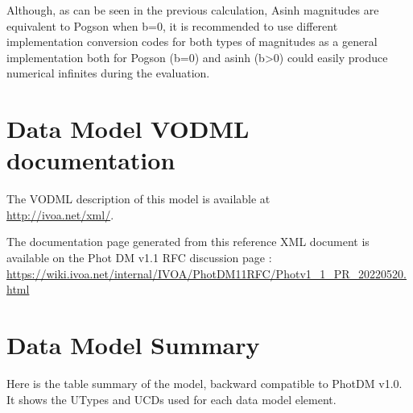 \documentclass[11pt,a4paper]{ivoa}
\begin{document}
\begin{appendices}
Although, as can be seen in the previous calculation, Asinh magnitudes are equivalent to Pogson
when b=0, it is recommended to use different implementation conversion codes for both types of magnitudes as a general implementation both for Pogson (b=0) and asinh (b>0) could easily produce numerical infinites during the evaluation.
\par
\section{Data Model VODML documentation}

The VODML description of this model is available at \\ \url{http://ivoa.net/xml/}.

The documentation page generated from this reference XML document is available on the Phot DM v1.1 RFC discussion page : \\
\url{https://wiki.ivoa.net/internal/IVOA/PhotDM11RFC/Photv1_1_PR_20220520.html}

\section{Data Model Summary}
Here is the table summary  of the model, backward compatible to PhotDM v1.0.
It shows the UTypes and UCDs used for each data model element.



\end{appendices}
\end{document}
